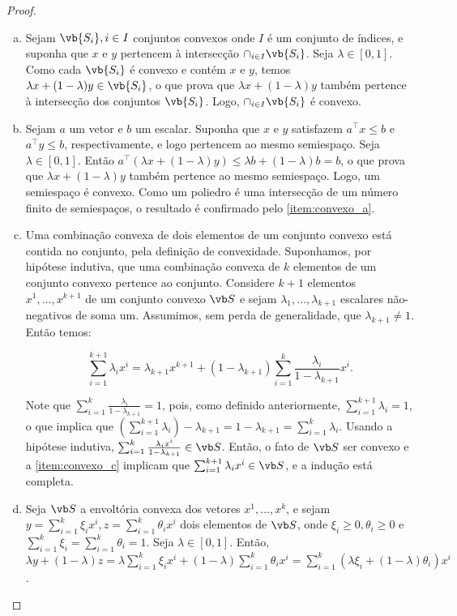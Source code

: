 \begin{proof}
 \begin{enumerate}[(a)]
     \item\label{item:convexo_a} Sejam $\vb{S_i}, i \in I$ conjuntos convexos onde $I$ é um conjunto de índices, e suponha que $x$ e $y$ pertencem à intersecção $\cap _{i\in I}\vb{S_i}$. Seja $\lambda\in [0,1]$. Como cada $\vb{S_i}$ é convexo e contém $x$ e $y$, temos $\lambda x + (1 - \lambda)y \in \vb{S_i}$, o que prova que $\lambda x + (1-\lambda)y$ também pertence à intersecção dos conjuntos $\vb{S_i}$. Logo, $\cap _{i \in I} \vb{S_i}$ é convexo.
     \item Sejam $a$ um vetor e $b$ um escalar. Suponha que $x$ e $y$ satisfazem $a^\intercal x\leq b$ e $a^\intercal y\leq b$, respectivamente, e logo pertencem ao mesmo semiespaço. Seja $\lambda \in [0,1]$. Então $a^\intercal(\lambda x + (1-\lambda)y)\leq \lambda b + (1-\lambda)b = b$, o que prova que $\lambda x + (1 - \lambda)y$ também pertence ao mesmo semiespaço. Logo, um semiespaço é convexo. Como um poliedro é uma intersecção de um número finito de semiespaços, o resultado é confirmado pelo \cref{item:convexo_a}.
     \item Uma combinação convexa de dois elementos de um conjunto convexo está contida no conjunto, pela definição de convexidade. Suponhamos, por hipótese indutiva, que uma combinação convexa de $k$ elementos de um conjunto convexo pertence ao conjunto. Considere $k+1$ elementos $x^1,\ldots,x^{k+1}$ de um conjunto convexo $\vb S$ e sejam $\lambda_1,\ldots,\lambda_{k+1}$ escalares não-negativos de soma um. Assumimos, sem perda de generalidade, que $\lambda_{k+1}\neq1$. Então temos:
     
     \begin{equation}\label{item:convexo_c}
        \sum^{k+1}_{i=1}\lambda_ix^i=\lambda_{k+1}x^{k+1}+(1-\lambda_{k+1})\sum^k_{i=1}\frac{\lambda_i}{1-\lambda_{k+1}}x^i.
    \end{equation}
    
    Note que $\sum_{i=1}^k{\frac{\lambda_i}{1-\lambda_{k+1}}} = 1$, pois, como definido anteriormente, $\sum_{i=1}^{k+1}{\lambda_i} = 1$, o que implica que $(\sum_{i=1}^{k+1}\lambda_i) - \lambda_{k+1} = 1 - \lambda_{k+1} = \sum_{i=1}^{k}\lambda_i$. Usando a hipótese indutiva, $\sum^k_{i=1}\frac{\lambda_{i}x^i}{1-\lambda_{k+1}} \in \vb S$. Então, o fato de $\vb S$ ser convexo e a \cref{item:convexo_c} implicam que $\sum^{k+1}_{i=1}\lambda_ix^i\in \vb S$, e a indução está completa.
     \item Seja $\vb S$ a envoltória convexa dos vetores $x^1,\ldots,x^k$, e sejam $y=\sum^k_{i=1}\xi_ix^i,z=\sum^k_{i=1}\theta_ix^i$ dois elementos de $\vb S$, onde $\xi_i\geq0, \theta_i\geq0$ e $\sum^k_{i=1}\xi_i=\sum^k_{i=1}\theta_i=1$. Seja $\lambda\in[0,1]$. Então, $\lambda y + (1-\lambda)z=\lambda\sum^k_{i=1}\xi_ix^i+(1-\lambda)\sum^k_{i=1}\theta_ix^i=\sum^k_{i=1}(\lambda\xi_i+(1-\lambda)\theta_i)x^i$.
     

\end{enumerate}
\end{proof}
